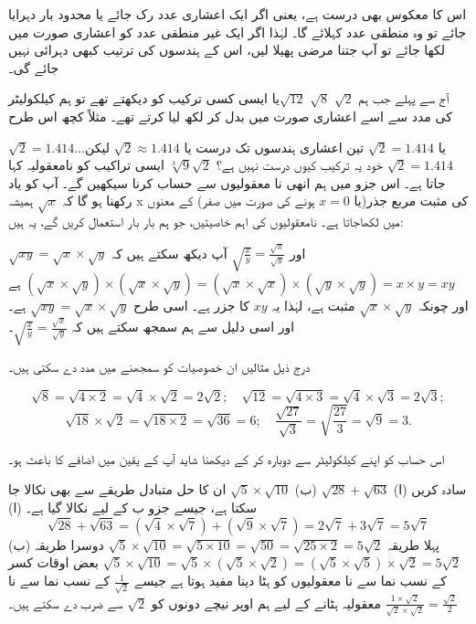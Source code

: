 اس کا معکوس بھی درست ہے، یعنی اگر ایک اعشاری عدد رک جائے یا محدود بار دہرایا جائے تو وہ منطقی عدد کہلائے گا۔ لہٰذا اگر ایک غیر منطقی عدد کو اعشاری صورت میں لکھا جائے تو آپ جتنا مرضی پھیلا لیں، اس کے ہندسوں کی ترتیب کبھی دہرائی نہیں جائے گی۔

آج سے پہلے جب ہم  \(\sqrt{2}\) \(\sqrt{8}\) \(\sqrt{12}\)یا ایسی کسی ترکیب کو دیکھتے تھے تو ہم کیلکولیٹر کی مدد سے اسے اعشاری صورت میں بدل کر لکھ لیا کرتے تھے۔ مثلاً کچھ اس طرح

\(\sqrt{2}=1.414\dotsc\)یا 
\(\sqrt{2}=1.414\) تین اعشاری ہندسوں تک درست یا
\(\sqrt{2}\approx 1.414\)
لیکن \(\sqrt{2}=1.414\) خود یہ ترکیب کیوں درست نہیں ہے؟
\(\sqrt{2}\)\(\sqrt[3]{9}\) ایسی تراکیب کو نامعقولیہ کہا جاتا ہے۔ اس جزو میں ہم انھی نا معقولیوں سے حساب کرنا سیکھیں گے۔
آپ کو یاد رکھنا ہو گا کہ \(\sqrt{x}\) ہمیشہ x کی مثبت مربع جذر(یا \(x=0\) ہونے کی صورت میں صفر) کے معنوں میں لکھاجاتا ہے۔
نامعقولیوں کی اہم خاصیتیں، جو ہم بار بار استعمال کریں گے، یہ ہیں:

\(\sqrt{xy}=\sqrt{x}\times\sqrt{y}\)
 اور 
\(\sqrt{\frac{x}{y}}=\frac{\sqrt{x}}{\sqrt{y}}\)
آپ دیکھ سکتے ہیں کہ \((\sqrt{x}\times\sqrt{y})\times(\sqrt{x}\times\sqrt{y})=(\sqrt{x}\times\sqrt{x})\times(\sqrt{y}\times\sqrt{y})=x\times y=xy\)  ہے اور چونکہ \(\sqrt{x}\times\sqrt{y}\) مثبت ہے، لہٰذا یہ \(xy\) کا جزر ہے۔ اسی طرح \(\sqrt{xy}=\sqrt{x}\times\sqrt{y}\) ہے۔ اور اسی دلیل سے ہم سمجھ سکتے ہیں کہ \(\sqrt{\frac{x}{y}}=\frac{\sqrt{x}}{\sqrt{y}}\)۔

درج ذیل مثالیں ان خصوصیات کو سمجھنے میں مدد دے سکتی ہیں۔

\[\sqrt{8}=\sqrt{4\times 2}=\sqrt{4}\times\sqrt{2}=2\sqrt{2};\quad\sqrt{12}=\sqrt{4\times 3}=\sqrt{4}\times\sqrt{3}=2\sqrt{3};\]
\[\sqrt{18}\times \sqrt{2}=\sqrt{18\times 2}=\sqrt{36}=6;\quad \frac{\sqrt{27}}{\sqrt{3}}=\sqrt{\frac{27}{3}}=\sqrt{9}=3.\]

اس حساب کو اپنے کیلکولیٹر سے دوبارہ کر کے دیکھنا شاید آپ کے یقین میں اضافے کا باعث ہو۔

سادہ کریں 
(ا)
\(\sqrt{28}+\sqrt{63}\)
(ب) 
\(\sqrt{5}\times \sqrt{10}\)
ان کا حل متبادل طریقے سے بھی نکالا جا سکتا ہے، جیسے جزو ب کے لیے نکالا گیا ہے۔
(ا) \[\sqrt{28}+\sqrt{63}=(\sqrt{4}\times\sqrt{7})+(\sqrt{9}\times\sqrt{7})=2\sqrt{7}+3\sqrt{7}=5\sqrt{7}\]
(ب) پہلا طریقہ \(\sqrt{5}\times\sqrt{10}=\sqrt{5\times10}=\sqrt{50}=\sqrt{25\times 2}=5\sqrt{2}\)
دوسرا طریقہ \(\sqrt{5}\times\sqrt{10}=\sqrt{5}\times(\sqrt{5}\times\sqrt{2})=(\sqrt{5}\times\sqrt{5})\times\sqrt{2}=5\sqrt{2}\)
بعض اوقات کسر کے نسب نما سے نا معقولیوں کو ہٹا دینا مفید ہوتا ہے جیسے \(\frac{1}{\sqrt{2}}\) کے نسب نما سے نا معقولیہ ہٹانے کے لیے ہم اوپر نیچے دونوں کو \(\sqrt{2}\) سے ضرب دے سکتے ہیں۔ \(\frac{1\times\sqrt{2}}{\sqrt{2}\times\sqrt{2}}=\frac{\sqrt{2}}{2}\)

